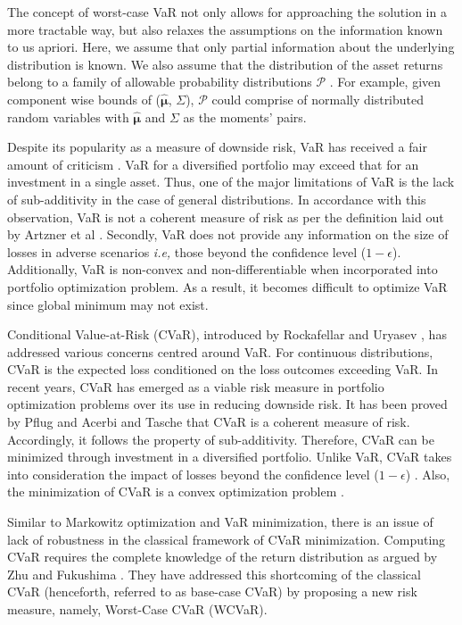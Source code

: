 \documentclass[12pt]{article}
\numberwithin{equation}{section}
\begin{document}
The concept of worst-case VaR not only allows for approaching the solution in a more tractable way, but also relaxes the assumptions on the information known to us apriori. Here, we assume that only partial information about the underlying distribution is known. We also assume that the distribution of the asset returns belong to a family of allowable probability distributions $\mathcal{P}$ \cite{ghaoui03}. For example, given component wise bounds of ($\hat{\boldsymbol{\mu}}$,  $\Sigma$), $\mathcal{P}$ could comprise of normally distributed random variables with $\hat{\boldsymbol{\mu}}$ and $\Sigma$ as the moments' pairs.

Despite its popularity as a measure of downside risk, VaR has received a fair amount of criticism \cite{capinski_risk,zhu,lim}. VaR for a diversified portfolio may exceed that for an investment in a single asset. Thus, one of the major limitations of VaR is the lack of sub-additivity in the case of general distributions. In accordance with this observation, VaR is not a coherent measure of risk as per the definition laid out by Artzner et al \cite{artzner}. Secondly, VaR does not provide any information on the size of losses in adverse scenarios \textit{i.e,} those beyond the confidence level ($1-\epsilon$). Additionally, VaR is non-convex and non-differentiable when incorporated into portfolio optimization problem. As a result, it becomes difficult to optimize VaR since global minimum may not exist.

Conditional Value-at-Risk (CVaR), introduced by Rockafellar and Uryasev \cite{rockafellar1,rockafellar2}, has addressed various concerns centred around VaR. For continuous distributions, CVaR is the expected loss conditioned on the loss outcomes exceeding VaR. In recent years, CVaR has emerged as a viable risk measure in portfolio optimization problems over its use in reducing downside risk. It has been proved by Pflug \cite{pflug} and Acerbi and Tasche \cite{acerbi} that CVaR is a coherent measure of risk. Accordingly, it follows the property of sub-additivity. Therefore, CVaR can be minimized through investment in a diversified portfolio. Unlike VaR, CVaR takes into consideration the impact of losses beyond the confidence level ($1-\epsilon$) \cite{capinski_risk}. Also, the minimization of CVaR is a convex optimization problem \cite{lim}.

Similar to Markowitz optimization and VaR minimization, there is an issue of lack of robustness in the classical framework of CVaR minimization. Computing CVaR requires the complete knowledge of the return distribution as argued by Zhu and Fukushima \cite{zhu}. They have addressed this shortcoming of the classical CVaR (henceforth, referred to as base-case CVaR) by proposing a new risk measure, namely, Worst-Case CVaR (WCVaR).
\end{document}
